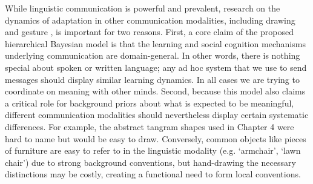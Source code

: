 \documentclass[11pt]{article}
\begin{document}
While linguistic communication is powerful and prevalent, research on the dynamics of adaptation in other communication modalities, including drawing \cite{GarrodFayLeeOberlanderMacLeod07_GraphicalSymbolSystems,Galantucci05_EmergenceOfCommunication,HealeySwobodaUmataKing07_GraphicalLanguageGames,TheisenEtAl10_SystematicityArbitrariness,FayGarrodRobertsSwoboda10_InteractiveEvolution} and gesture  \cite{goldin1996silence,goldin-meadow_role_1999}, is important for two reasons.
First, a core claim of the proposed hierarchical Bayesian model is that the learning and social cognition mechanisms underlying communication are domain-general.
In other words, there is nothing special about spoken or written language; any ad hoc system that we use to send messages should display similar learning dynamics.
In all cases we are trying to coordinate on meaning with other minds. 
Second, because this model also claims a critical role for background priors about what is expected to be meaningful, different communication modalities should nevertheless display certain systematic differences.
For example, the abstract tangram shapes used in Chapter 4 were hard to name but would be easy to draw.
Conversely, common objects like pieces of furniture are easy to refer to in the linguistic modality (e.g. `armchair', `lawn chair') due to strong background conventions, but hand-drawing the necessary distinctions may be costly, creating a functional need to form local conventions. 
\end{document}
